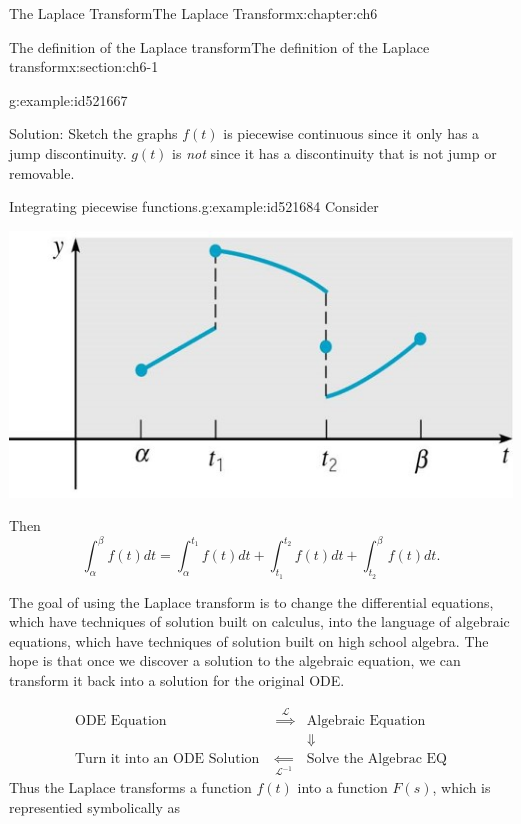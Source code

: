 \documentclass[oneside,10pt,]{book}
\numberwithin{equation}{section}
\numberwithin{equation}{section}
\newcommand{\amp}{&}
\begin{document}
\begin{chapterptx}{The Laplace Transform}{}{The Laplace Transform}{}{}{x:chapter:ch6}
\begin{sectionptx}{The definition of the Laplace transform}{}{The definition of the Laplace transform}{}{}{x:section:ch6-1}
\begin{example}{}{g:example:id521667}
\begin{equation*}
\end{equation*}
%
\par
Solution: Sketch the graphs \(f(t)\) is piecewise continuous since it only has a jump discontinuity. \(g(t)\) is \emph{not} since it has a discontinuity that is not jump or removable.%
\end{example}
\begin{example}{Integrating piecewise functions.}{g:example:id521684}%
Consider \begin{image}{0.25}{0.5}{0.25}%
\includegraphics[width=\linewidth]{images/6.1-1.jpg}
\end{image}%
 Then%
\begin{equation*}
\int_{\alpha}^{\beta}f(t)dt=\int_{\alpha}^{t_{1}}f(t)dt+\int_{t_{1}}^{t_{2}}f(t)dt+\int_{t_{2}}^{\beta}f(t)dt.
\end{equation*}
%
\end{example}
The goal of using the Laplace transform is to change the differential equations, which have techniques of solution built on calculus, into the language of algebraic equations, which have techniques of solution built on high school algebra. The hope is that once we discover a solution to the algebraic equation, we can transform it back into a solution for the original ODE.%
\par
%
\begin{equation*}
\begin{array}{ccc}
\text{ODE Equation} \amp \overset{\mathcal{L}}{\implies} \amp \text{Algebraic Equation}\\
\amp  \amp \Downarrow\\
\text{Turn it into an ODE Solution } \amp \underset{\mathcal{L}^{-1}}{\Longleftarrow} \amp \text{Solve the Algebrac EQ}
\end{array}
\end{equation*}
Thus the Laplace transforms a function \(f(t)\) into a function \(F(s)\), which is representied symbolically as%

\end{sectionptx}
\end{chapterptx}
\end{document}
